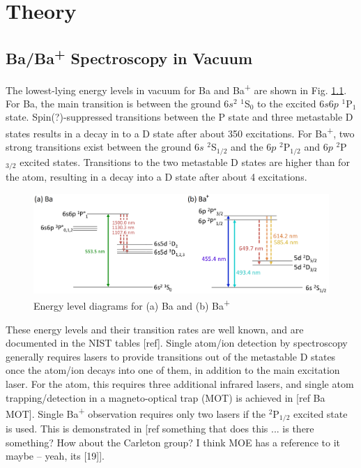 \chapter{Theory}


\section{Ba/Ba\textsuperscript{+} Spectroscopy in Vacuum}

The lowest-lying energy levels in vacuum for Ba and Ba\textsuperscript{+} are shown in Fig. \ref{fig:elevs}.  For Ba, the main transition is between the ground $6s^{2}$ $^{1}$S$_{0}$ to the excited $6s6p$ $^{1}$P$_{1}$ state.  Spin{\color{red}(?)}-suppressed transitions between the P state and three metastable D states results in a decay in to a D state after about 350 excitations.  For Ba\textsuperscript{+}, two strong transitions exist between the ground $6s$ $^{2}$S$_{1/2}$ and the $6p$ $^{2}$P$_{1/2}$ and $6p$ $^{2}$P$_{3/2}$ excited states.  Transitions to the two metastable D states are higher than for the atom, resulting in a decay into a D state after about 4 excitations.

\begin{figure}[H]
	\includegraphics[width=.9\textwidth]{figures/elevs.png}
	\caption{Energy level diagrams for (a) Ba and (b) Ba\textsuperscript{+}}
    \label{fig:elevs}
\end{figure}

These energy levels and their transition rates are well known, and are documented in the NIST tables [ref].  Single atom/ion detection by spectroscopy generally requires lasers to provide transitions out of the metastable D states once the atom/ion decays into one of them, in addition to the main excitation laser.  For the atom, this requires three additional infrared lasers, and single atom trapping/detection in a magneto-optical trap (MOT) is achieved in [ref Ba MOT].  Single Ba\textsuperscript{+} observation requires only two lasers if the $^{2}$P$_{1/2}$ excited state is used.  This is demonstrated in [ref something that does this ... is there something?  How about the Carleton group?  I think MOE has a reference to it maybe -- yeah, its [19]].

